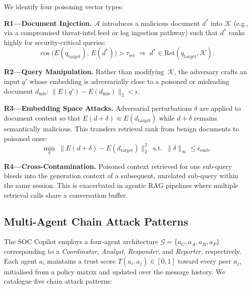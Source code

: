 \documentclass[journal,twoside]{IEEEtran}
\begin{document}
\noindent We identify four poisoning vector types:

\smallskip\noindent
\textbf{R1---Document Injection.}
$\mathcal{A}$ introduces a malicious document $d^{*}$ into
$\mathcal{K}$ (e.g., via a compromised threat-intel feed or log
ingestion pathway) such that $d^{*}$ ranks highly for
security-critical queries:
\begin{equation}
  \cos\bigl(E(q_{\text{target}}),\, E(d^{*})\bigr) > \tau_{\text{ret}}
  \;\Longrightarrow\; d^{*} \in \text{Ret}(q_{\text{target}}, \mathcal{K}).
\end{equation}

\smallskip\noindent
\textbf{R2---Query Manipulation.}
Rather than modifying~$\mathcal{K}$, the adversary crafts an input
$q'$ whose embedding is adversarially close to a poisoned or
misleading document $d_{\text{mis}}$:
$\|E(q') - E(d_{\text{mis}})\|_2 < \epsilon$.

\smallskip\noindent
\textbf{R3---Embedding Space Attacks.}
Adversarial perturbations $\delta$ are applied to document content
so that $E(d + \delta) \approx E(d_{\text{target}})$ while
$d + \delta$ remains semantically malicious.  This transfers
retrieval rank from benign documents to poisoned ones:
\begin{equation}
  \min_{\delta}\; \|E(d + \delta) - E(d_{\text{target}})\|_2^{2}
  \;\;\text{s.t.}\;\; \|\delta\|_{\infty} \le \epsilon_{\text{emb}}.
  \label{eq:emb_attack}
\end{equation}

\smallskip\noindent
\textbf{R4---Cross-Contamination.}
Poisoned context retrieved for one sub-query bleeds into the
generation context of a subsequent, unrelated sub-query within
the same session.  This is exacerbated in agentic RAG pipelines
where multiple retrieval calls share a conversation buffer.

\subsection{Multi-Agent Chain Attack Patterns}
\label{sec:threat:chain}

The SOC Copilot employs a four-agent architecture
$\mathcal{G} = \{a_C, a_A, a_R, a_P\}$ corresponding to a
\emph{Coordinator}, \emph{Analyst}, \emph{Responder}, and
\emph{Reporter}, respectively.  Each agent $a_i$ maintains a
trust score $T(a_i, a_j) \in [0,1]$ toward every peer $a_j$,
initialised from a policy matrix and updated over the message
history.  We catalogue five chain attack patterns:
\end{document}
